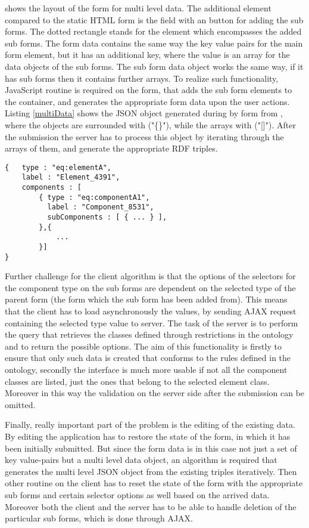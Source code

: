  shows the layout of the form for multi level data. The additional element compared to the static HTML form is the field with an button for adding the sub forms. The dotted rectangle stands for the element which encompasses the added sub forms. The form data contains the same way the key value pairs for the main form element, but it has an additional key, where the value is an array for the data objects of the sub forms. The sub form data object works the same way, if it has sub forms then it contains further arrays. To realize such functionality, JavaScript routine is required on the form, that adds the sub form elements to the container, and generates the appropriate form data upon the user actions. Listing \ref{multiData} shows the JSON object generated during by form from , where the objects are surrounded with ("\{\}"), while the arrays with ("[]"). After the submission the server has to process this object by iterating through the arrays of them, and generate the appropriate RDF triples.

\begin{lstlisting}[basicstyle=\footnotesize, frame=single, caption={Multi level form data in JSON}, label=multiData, captionpos=b, belowskip=1em, aboveskip=2em]
{	type : "eq:elementA",
	label : "Element_4391",
	components : [
		{ type : "eq:componentA1",
		  label : "Component_8531",	
		  subComponents : [ { ... } ],
		},{ 
			... 
		}]
}
\end{lstlisting}

Further challenge for the client algorithm is that the options of the selectors for the component type on the sub forms are dependent on the selected type of the parent form (the form which the sub form has been added from). This means that the client has to load asynchronously the values, by sending AJAX request containing the selected type value to server. The task of the server is to perform the query that retrieves the classes defined through restrictions in the ontology and to return the possible options. The aim of this functionality is firstly to ensure that only such data is created that conforms to the rules defined in the ontology, secondly the interface is much more usable if not all the component classes are listed, just the ones that belong to the selected element class. Moreover in this way the validation on the server side after the submission can be omitted.

Finally, really important part of the problem is the editing of the existing data. By editing the application has to restore the state of the form, in which it has been initially submitted. But since the form data is in this case not just a set of key value-pairs but a multi level data object, an algorithm is required that generates the multi level JSON object from the existing triples iteratively. Then other routine on the client has to reset the state of the form with the appropriate sub forms and certain selector options as well based on the arrived data. Moreover both the client and the server has to be able to handle deletion of the particular sub forms, which is done through AJAX.

